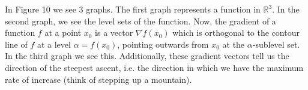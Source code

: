 \documentclass[12pt]{article}
\begin{document}
\noindent In Figure 10 we see 3 graphs. The first graph represents a function in $\mathbb{R}^3$. In the second graph, we see the level sets of the function. Now, the gradient of a function $f$ at a point $x_0$ is a vector $\nabla f(x_0)$ which is orthogonal to the contour line of $f$ at a level $\alpha = f(x_0)$, pointing outwards from $x_0$ at the $\alpha$-sublevel set. In the third graph we see this. Additionally, these gradient vectors tell us the direction of the steepest ascent, i.e. the direction in which we have the maximum rate of increase (think of stepping up a mountain). 

\nocite{*}


\end{document}
